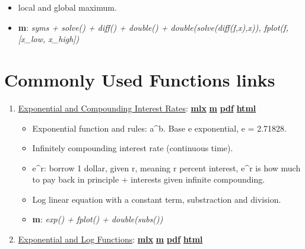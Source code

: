 \documentclass[
]{book}
\providecommand{\tightlist}{%
  \setlength{\itemsep}{0pt}\setlength{\parskip}{0pt}}
\begin{document}
\begin{enumerate}
  \begin{itemize}
  \tightlist
  \item
    local and global maximum.
  \item
    \textbf{m}: \emph{syms + solve() + diff() + double() + double(solve(diff(f,x),x)), fplot(f,{[}x\_low, x\_high{]})}
  \end{itemize}
\end{enumerate}

\hypertarget{commonly-used-functions-links}{%
\section{Commonly Used Functions links}\label{commonly-used-functions-links}}

\begin{enumerate}
\def\labelenumi{\arabic{enumi}.}
\tightlist
\item
  \href{https://Math4Econ.github.io/explog/htmlpdfm/exponential.html}{Exponential and Compounding Interest Rates}: \href{https://github.com/Math4Econ/Math4Econ.github.io/blob/main/explog/exponential.mlx}{\textbf{mlx}} \textbar{} \href{https://github.com/Math4Econ/Math4Econ.github.io/blob/main/explog/htmlpdfm/exponential.m}{\textbf{m}} \textbar{} \href{https://github.com/Math4Econ/Math4Econ.github.io/blob/main/explog/htmlpdfm/exponential.pdf}{\textbf{pdf}} \textbar{} \href{https://Math4Econ.github.io/explog/htmlpdfm/exponential.html}{\textbf{html}}

  \begin{itemize}
  \tightlist
  \item
    Exponential function and rules: a\^{}b. Base e exponential, e = 2.71828.
  \item
    Infinitely compounding interest rate (continuous time).
  \item
    e\^{}r: borrow 1 dollar, given r, meaning r percent interest, e\^{}r is how much to pay back in principle + interests given infinite compounding.
  \item
    Log linear equation with a constant term, substraction and division.
  \item
    \textbf{m}: \emph{exp() + fplot() + double(subs())}
  \end{itemize}
\item
  \href{https://Math4Econ.github.io/explog/htmlpdfm/exolog.html}{Exponential and Log Functions}: \href{https://github.com/Math4Econ/Math4Econ.github.io/blob/main/explog/exolog.mlx}{\textbf{mlx}} \textbar{} \href{https://github.com/Math4Econ/Math4Econ.github.io/blob/main/explog/htmlpdfm/exolog.m}{\textbf{m}} \textbar{} \href{https://github.com/Math4Econ/Math4Econ.github.io/blob/main/explog/htmlpdfm/exolog.pdf}{\textbf{pdf}} \textbar{} \href{https://Math4Econ.github.io/explog/htmlpdfm/exolog.html}{\textbf{html}}


\end{enumerate}
\end{document}
